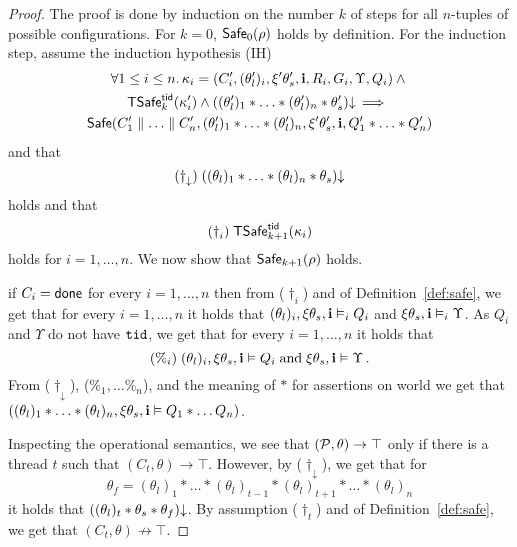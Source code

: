 \begin{proof}
The proof is done by induction on the number $k$ of steps for all $n$-tuples of 
possible configurations. 
For $k=0$, ${\sf Safe}_0(\rho)$ holds by definition.
For the induction step,
assume the induction hypothesis (IH)
\begin{multline*}
\forall 1 \leq i \leq n.\, \kappa_i = (C'_i,(\theta'_l)_i,\xi'\theta'_s,{\bf i},R_i,G_i,\Upsilon, Q_i) \land \mbox{}\\
{\sf TSafe}^{{\sf tid}}_k(\kappa'_i) \land ((\theta'_l)_1 * \ldots * (\theta'_l)_n * \theta'_s)\mathpunct{\downarrow} \implies \mbox{}\\
{\sf Safe}(C'_1 \parallel \ldots \parallel C'_n,
 (\theta'_l)_1 * \ldots * (\theta'_l)_n,
 \xi'\theta'_s,
 {\bf i},Q'_1 * \ldots * Q'_n)
\end{multline*}
and that 
\[
(\dag_{\downarrow}) \; ((\theta_l)_1 * \ldots * (\theta_l)_n * \theta_s)\mathpunct{\downarrow}
\]
holds and that
\[
(\dag_i) \;{\sf TSafe}^{{\sf tid}}_{k+1}(\kappa_i) 
\]
holds for $i=1,\ldots,n$.
We now show that ${\sf Safe}_{k+1}(\rho)$ holds.

 if $C_i={\sf done}$ for every $i=1,\ldots,n$ then from ($\dag_i$) and
 of Definition~\ref{def:safe}, we get that 
for every $i=1,\ldots,n$ it holds that 
$(\theta_l)_i,\xi\theta_s,{\bf i} \vDash_i Q_i$ and 
$\xi\theta_s,{\bf i}\vDash_i\Upsilon$.
As $Q_i$ and $\Upsilon$ do not have $\texttt{tid}$, we get that 
for every $i=1,\ldots,n$ it holds that  
\[
(\%_i)\;
(\theta_l)_i,\xi\theta_s,{\bf i} \vDash  Q_i \;\text{and}\; 
\xi\theta_s,{\bf i}\vDash \Upsilon\,. 
\]
From ($\dag_{\downarrow}$), ($\%_1,\ldots \%_n$), and the meaning of $*$ for assertions on world 
we get that 
$((\theta_l)_1 * \ldots * (\theta_l)_n, \xi\theta_s,{\bf i} \vDash Q_1 *\ldots Q_n)$.

Inspecting the operational semantics, we see that $(\mathcal{P},\theta)\rightarrow \top$
only if there is a thread $t$ such that $(C_t,\theta)\rightarrow \top$.
However, by ($\dag_{\downarrow}$), we get that 
for 
$$
\theta_f=(\theta_l)_1 * \ldots * (\theta_l)_{t-1} * (\theta_l)_{t+1} * \ldots * (\theta_l)_n
$$
it holds that $((\theta_l)_t * \theta_s * \theta_f)\mathpunct{\downarrow}$.
By assumption ($\dag_t$) and  of Definition~\ref{def:safe}, we get that $(C_t,\theta)\not\rightarrow \top$.


\end{proof}
